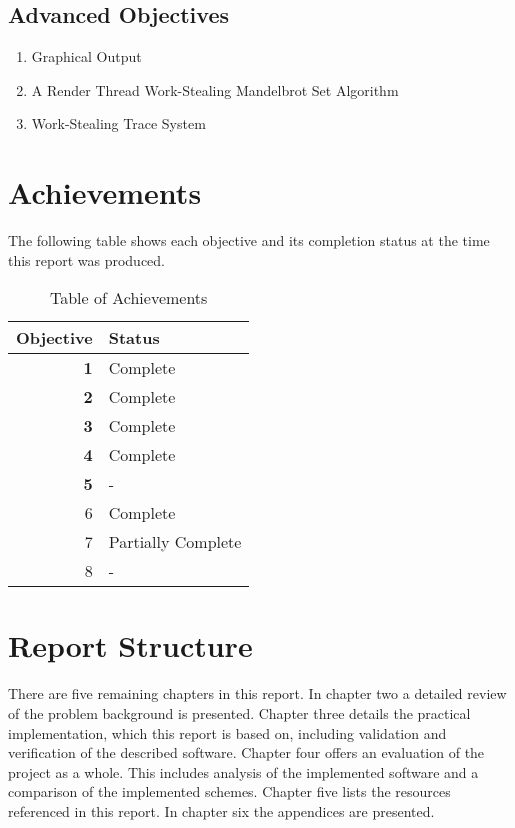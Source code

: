 \subsection*{Advanced Objectives}
\begin{enumerate}
\setcounter{enumi}{\value{saveenum}}
\item Graphical Output
\item A Render Thread Work-Stealing Mandelbrot Set Algorithm
\item Work-Stealing Trace System
\end{enumerate}

\section*{Achievements}
The following table shows each objective and its completion status at the time this
report was produced. 

\begin{table}[H]
    \centering
    \begin{tabular}{|r|l|}
        \hline
            \textbf{Objective} & \textbf{Status} \\
        \hline \hline
            \textbf{1} & Complete \\
            \textbf{2} & Complete \\
            \textbf{3} & Complete \\
            \textbf{4} & Complete \\
            \textbf{5} & - \\
        \hline
            6 & Complete \\
            7 & Partially Complete \\
            8 & - \\
        \hline
    \end{tabular}
    
    \label{tab:ach}
    \caption{Table of Achievements}
\end{table}

\section*{Report Structure}

There are five remaining chapters in this report. 
In chapter two a detailed review of the problem background is presented. 
Chapter three details the practical implementation, which this report is based on, including validation and verification of the described software.
Chapter four offers an evaluation of the project as a whole. This includes analysis of the implemented software and a comparison of the implemented
schemes.
Chapter five lists the resources referenced in this report.
In chapter six the appendices are presented.

